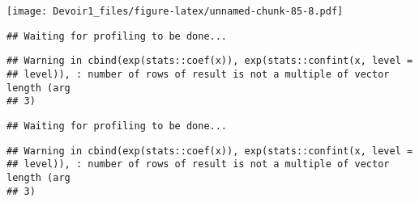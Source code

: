 \documentclass[]{article}
\newenvironment{Shaded}{\begin{snugshade}}{\end{snugshade}}
\newcommand{\KeywordTok}[1]{\textcolor[rgb]{0.13,0.29,0.53}{\textbf{#1}}}
\newcommand{\DataTypeTok}[1]{\textcolor[rgb]{0.13,0.29,0.53}{#1}}
\newcommand{\DecValTok}[1]{\textcolor[rgb]{0.00,0.00,0.81}{#1}}
\newcommand{\StringTok}[1]{\textcolor[rgb]{0.31,0.60,0.02}{#1}}
\newcommand{\OperatorTok}[1]{\textcolor[rgb]{0.81,0.36,0.00}{\textbf{#1}}}
\newcommand{\NormalTok}[1]{#1}
\begin{document}
\texttt{[image: Devoir1\_files/figure-latex/unnamed-chunk-85-8.pdf]}

\begin{Shaded}
\end{Shaded}

\begin{verbatim}
## Waiting for profiling to be done...
\end{verbatim}

\begin{verbatim}
## Warning in cbind(exp(stats::coef(x)), exp(stats::confint(x, level =
## level)), : number of rows of result is not a multiple of vector length (arg
## 3)
\end{verbatim}

\begin{verbatim}
## Waiting for profiling to be done...
\end{verbatim}

\begin{verbatim}
## Warning in cbind(exp(stats::coef(x)), exp(stats::confint(x, level =
## level)), : number of rows of result is not a multiple of vector length (arg
## 3)
\end{verbatim}
\end{document}
